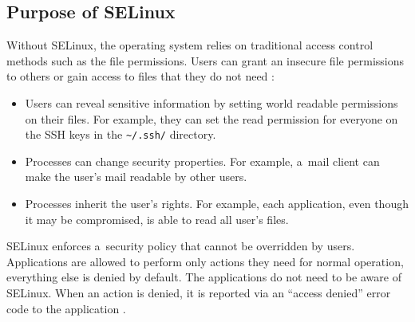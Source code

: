 \subsection{Purpose of SELinux}
Without SELinux, the operating system relies on traditional access control
methods such as the file permissions. Users can grant an insecure file
permissions to others or gain access to files that they do not need
\cite{selinuxguide}:
\begin{itemize}
    \item Users can reveal sensitive information by setting world readable
        permissions on their files. For example, they can set the read
        permission for everyone on the SSH keys in the
        \texttt{\textasciitilde/.ssh/} directory.
    \item Processes can change security properties. For example, a~mail client
        can make the user's mail readable by other users.
    \item Processes inherit the user's rights. For example, each application,
        even though it may be compromised, is able to read all user's files.
\end{itemize}

SELinux enforces a~security policy that cannot be overridden by users.
Applications are allowed to perform only actions they need for normal operation,
everything else is denied by default. The applications do not need to be aware
of SELinux. When an action is denied, it is reported via an ``access denied''
error code to the application \cite{centoshowto}.

%
%    
%
%

